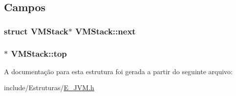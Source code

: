 \subsection{Campos}
\hypertarget{struct_v_m_stack_ab4cf67571dfab96182dfd57bf6037d6b}{}
\subsubsection[{next}]{\setlength{\rightskip}{0pt plus 5cm}struct {\bf V\+M\+Stack}$\ast$ V\+M\+Stack\+::next}\label{struct_v_m_stack_ab4cf67571dfab96182dfd57bf6037d6b}
\hypertarget{struct_v_m_stack_a4ced44fa90e0389a8b25963637c1708d}{}
\subsubsection[{top}]{$\ast$ V\+M\+Stack\+::top}\label{struct_v_m_stack_a4ced44fa90e0389a8b25963637c1708d}


A documentação para esta estrutura foi gerada a partir do seguinte arquivo\+:\begin{DoxyCompactItemize}
\item 
include/\+Estruturas/\hyperlink{_e___j_v_m_8h}{E\+\_\+\+J\+V\+M.\+h}\end{DoxyCompactItemize}
